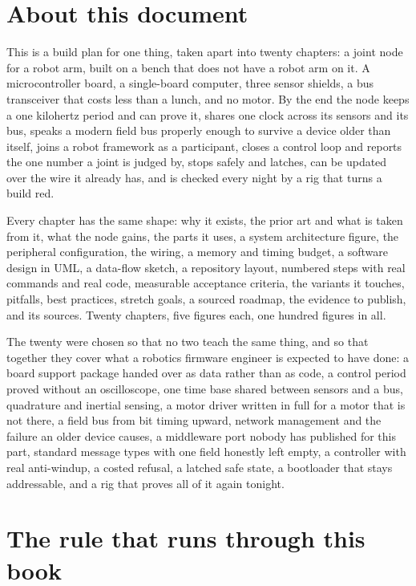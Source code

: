 \section*{About this document}

This is a build plan for one thing, taken apart into twenty chapters: a joint
node for a robot arm, built on a bench that does not have a robot arm on it. A
microcontroller board, a single-board computer, three sensor shields, a bus
transceiver that costs less than a lunch, and no motor. By the end the node
keeps a one kilohertz period and can prove it, shares one clock across its
sensors and its bus, speaks a modern field bus properly enough to survive a
device older than itself, joins a robot framework as a participant, closes a
control loop and reports the one number a joint is judged by, stops safely and
latches, can be updated over the wire it already has, and is checked every
night by a rig that turns a build red.

Every chapter has the same shape: why it exists, the prior art and what is taken
from it, what the node gains, the parts it uses, a system architecture figure,
the peripheral configuration, the wiring, a memory and timing budget, a software
design in UML, a data-flow sketch, a repository layout, numbered steps with real
commands and real code, measurable acceptance criteria, the variants it touches,
pitfalls, best practices, stretch goals, a sourced roadmap, the evidence to
publish, and its sources. Twenty chapters, five figures each, one hundred
figures in all.

The twenty were chosen so that no two teach the same thing, and so that together
they cover what a robotics firmware engineer is expected to have done: a board
support package handed over as data rather than as code, a control period proved
without an oscilloscope, one time base shared between sensors and a bus,
quadrature and inertial sensing, a motor driver written in full for a motor that
is not there, a field bus from bit timing upward, network management and the
failure an older device causes, a middleware port nobody has published for this
part, standard message types with one field honestly left empty, a controller
with real anti-windup, a costed refusal, a latched safe state, a bootloader that
stays addressable, and a rig that proves all of it again tonight.

\section*{The rule that runs through this book}

